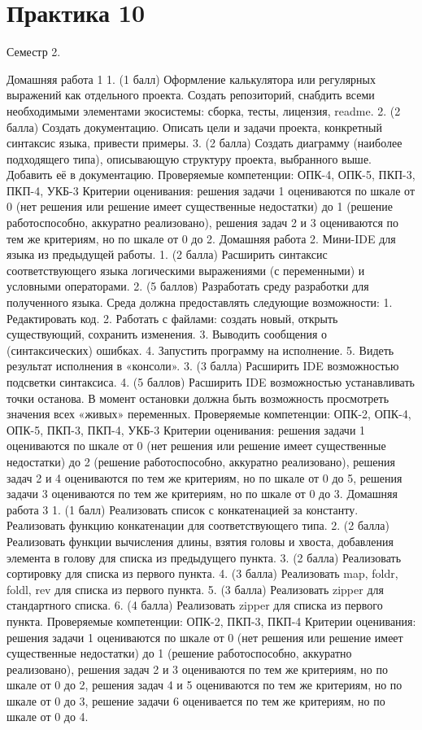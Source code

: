 \section{Практика 10}


Семестр 2.

Домашняя работа 1 
    1. (1 балл) Оформление калькулятора или регулярных выражений как отдельного проекта. Создать репозиторий, снабдить всеми необходимыми элементами экосистемы: сборка, тесты, лицензия, readme.
    2. (2 балла) Создать документацию. Описать цели и задачи проекта, конкретный синтаксис языка, привести примеры.
    3. (2 балла) Создать диаграмму (наиболее подходящего типа), описывающую структуру проекта, выбранного выше. Добавить её в документацию.
Проверяемые компетенции: ОПК-4, ОПК-5, ПКП-3, ПКП-4, УКБ-3
Критерии оценивания: решения задачи 1 оцениваются по шкале от 0 (нет решения или решение имеет существенные недостатки) до 1 (решение работоспособно, аккуратно реализовано), решения задач 2 и 3 оцениваются по тем же критериям, но по шкале от 0 до 2.
Домашняя работа 2. Мини-IDE для языка из предыдущей работы.
    1. (2 балла) Расширить синтаксис соответствующего языка логическими выражениями (с переменными) и условными операторами.
    2. (5 баллов) Разработать среду разработки для полученного языка. Среда должна предоставлять следующие возможности:
        1. Редактировать код.
        2. Работать с файлами: создать новый, открыть существующий, сохранить изменения. 
        3. Выводить сообщения о (синтаксических) ошибках.
        4. Запустить программу на исполнение.
        5. Видеть результат исполнения в «консоли».
    3. (3 балла) Расширить IDE возможностью подсветки синтаксиса.
    4. (5 баллов) Расширить IDE возможностью устанавливать точки останова. В момент остановки должна быть возможность просмотреть значения всех «живых» переменных.
Проверяемые компетенции: ОПК-2, ОПК-4, ОПК-5, ПКП-3, ПКП-4, УКБ-3
Критерии оценивания: решения задачи 1 оцениваются по шкале от 0 (нет решения или решение имеет существенные недостатки) до 2 (решение работоспособно, аккуратно реализовано), решения задач 2 и 4 оцениваются по тем же критериям, но по шкале от 0 до 5, решения задачи 3 оцениваются по тем же критериям, но по шкале от 0 до 3.
Домашняя работа 3 
    1. (1 балл) Реализовать список с конкатенацией за константу. Реализовать функцию конкатенации для соответствующего типа.
    2. (2 балла) Реализовать функции вычисления длины, взятия головы и хвоста, добавления элемента в голову для списка из предыдущего пункта.
    3. (2 балла) Реализовать сортировку для списка из первого пункта.
    4. (3 балла) Реализовать map, foldr, foldl, rev для списка из первого пункта.
    5. (3 балла) Реализовать zipper для стандартного списка.
    6. (4 балла) Реализовать zipper для списка из первого пункта.
Проверяемые компетенции: ОПК-2, ПКП-3, ПКП-4
Критерии оценивания: решения задачи 1 оцениваются по шкале от 0 (нет решения или решение имеет существенные недостатки) до 1 (решение работоспособно, аккуратно реализовано), решения задач 2 и 3 оцениваются по тем же критериям, но по шкале от 0 до 2, решения задач 4 и 5 оцениваются по тем же критериям, но по шкале от 0 до 3, решение задачи 6 оценивается по тем же критериям, но по шкале от 0 до 4.
  
